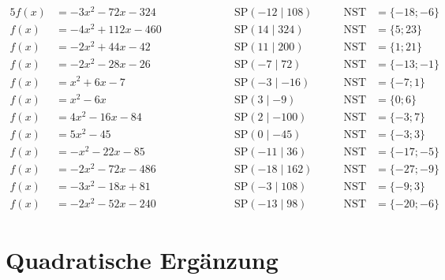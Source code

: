 \documentclass
[
  draft    = true,
  fontsize = 11pt,
  parskip  = half-,
  BCOR     = 0pt,
  DIV      = 11
]
{scrartcl}
\begin{document}
\begin{alignat*}{5}
  f(x)&=-3x^{2}-72x-324 \qquad&\qquad \quad&\text{SP}(-12\mid108) \quad&\quad \text{NST}&=\{-18;-6\} \\[0.5ex]
  f(x)&=-4x^{2}+112x-460 \qquad&\qquad \quad&\text{SP}(14\mid324) \quad&\quad \text{NST}&=\{5;23\} \\[0.5ex]
  f(x)&=-2x^{2}+44x-42 \qquad&\qquad \quad&\text{SP}(11\mid200) \quad&\quad \text{NST}&=\{1;21\} \\[0.5ex]
  f(x)&=-2x^{2}-28x-26 \qquad&\qquad \quad&\text{SP}(-7\mid72) \quad&\quad \text{NST}&=\{-13;-1\} \\[0.5ex]
  f(x)&=x^{2}+6x-7 \qquad&\qquad \quad&\text{SP}(-3\mid-16) \quad&\quad \text{NST}&=\{-7;1\} \\[0.5ex]
  f(x)&=x^{2}-6x \qquad&\qquad \quad&\text{SP}(3\mid-9) \quad&\quad \text{NST}&=\{0;6\} \\[0.5ex]
  f(x)&=4x^{2}-16x-84 \qquad&\qquad \quad&\text{SP}(2\mid-100) \quad&\quad \text{NST}&=\{-3;7\} \\[0.5ex]
  f(x)&=5x^{2}-45 \qquad&\qquad \quad&\text{SP}(0\mid-45) \quad&\quad \text{NST}&=\{-3;3\} \\[0.5ex]
  f(x)&=-x^{2}-22x-85 \qquad&\qquad \quad&\text{SP}(-11\mid36) \quad&\quad \text{NST}&=\{-17;-5\} \\[0.5ex]
  f(x)&=-2x^{2}-72x-486 \qquad&\qquad \quad&\text{SP}(-18\mid162) \quad&\quad \text{NST}&=\{-27;-9\} \\[0.5ex]
  f(x)&=-3x^{2}-18x+81 \qquad&\qquad \quad&\text{SP}(-3\mid108) \quad&\quad \text{NST}&=\{-9;3\} \\[0.5ex]
  f(x)&=-2x^{2}-52x-240 \qquad&\qquad \quad&\text{SP}(-13\mid98) \quad&\quad \text{NST}&=\{-20;-6\}
\end{alignat*}

\clearpage
\section*{Quadratische Ergänzung}
\end{document}
